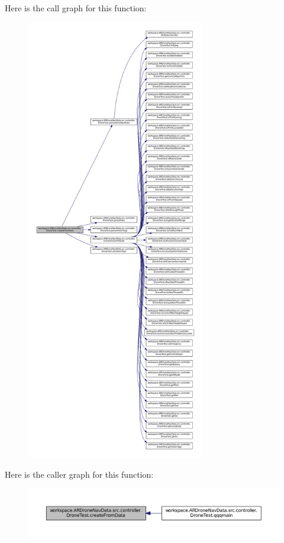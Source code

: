 Here is the call graph for this function\+:
\nopagebreak
\begin{figure}[H]
\begin{center}
\leavevmode
\includegraphics[height=550pt]{classworkspace_1_1_a_r_drone_nav_data_1_1src_1_1controller_1_1_drone_test_aa4c10cb1b2c95573f9c49fe9bb943f6d_cgraph}
\end{center}
\end{figure}




Here is the caller graph for this function\+:\nopagebreak
\begin{figure}[H]
\begin{center}
\leavevmode
\includegraphics[width=350pt]{classworkspace_1_1_a_r_drone_nav_data_1_1src_1_1controller_1_1_drone_test_aa4c10cb1b2c95573f9c49fe9bb943f6d_icgraph}
\end{center}
\end{figure}


